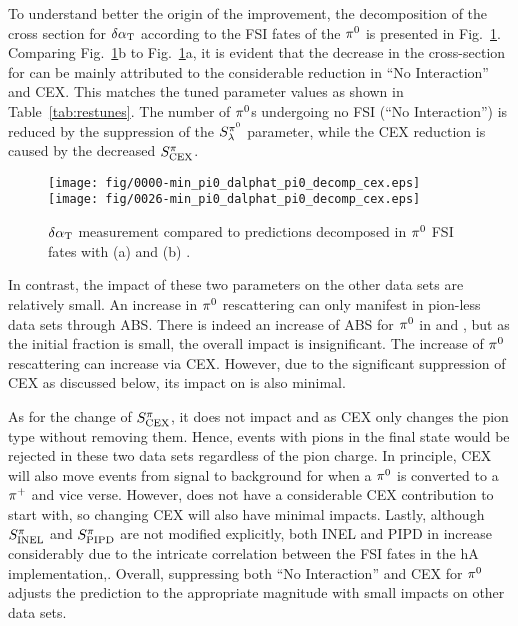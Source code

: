     To understand better the origin of the improvement, the decomposition of the cross section for $\delta\alpha_\textrm{T}$ according to the FSI fates of the $\pi^0$ is presented in Fig.~\ref{fig:CEX-minpiz-dat-pi0}.
    Comparing Fig.~\ref{fig:CEX-minpiz-dat-pi0}b to Fig.~\ref{fig:CEX-minpiz-dat-pi0}a, it is evident that the decrease in the cross-section for \gC can be mainly attributed to the considerable reduction in ``No Interaction'' and CEX.
    This matches the tuned parameter values as shown in Table~\ref{tab:restunes}.
    The number of $\pi^0$s undergoing no FSI (``No Interaction'') is reduced by the suppression of the $S_\lambda^{\pi^{0}}$ parameter, while the CEX reduction is caused by the decreased $S_\textrm{CEX}^{\pi}$.
    \begin{figure}[!htb] 	
        \centering 		
        \texttt{[image: fig/0000-min\_pi0\_dalphat\_pi0\_decomp\_cex.eps]}
        \texttt{[image: fig/0026-min\_pi0\_dalphat\_pi0\_decomp\_cex.eps]}	
        \caption{\label{fig:CEX-minpiz-dat-pi0} \minpiz $\delta\alpha_\textrm{T}$ measurement compared to \genie predictions decomposed in $\pi^0$ FSI fates with (a) \gZero and (b) \gC.} 
    \end{figure}
    In contrast, the impact of these two parameters on the other data sets are relatively small.
    An increase in $\pi^0$ rescattering can only manifest in pion-less data sets through ABS. 
    There is indeed an increase of ABS for $\pi^0$ in \ttkzpi and \minzpi, but as the initial fraction is small, the overall impact is insignificant. 
    The increase of $\pi^0$ rescattering can increase \ttkpip via CEX. 
    However, due to the significant suppression of CEX as discussed below, its impact on \ttkpip is also minimal. 
    
    As for the change of $S_\textrm{CEX}^{\pi}$, it does not impact \ttkzpi and \minzpi as CEX only changes the pion type without removing them.
    Hence, events with pions in the final state would be rejected in these two data sets regardless of the pion charge. 
    In principle, CEX will also move events from signal to background for \ttkpip when a $\pi^0$ is converted to a $\pi^+$ and vice verse. 
    However, \ttkpip does not have a considerable CEX contribution to start with, so changing CEX will also have minimal impacts. 
    Lastly, although $S_\textrm{INEL}^{\pi}$ and $S_\textrm{PIPD}^{\pi}$ are not modified explicitly, both INEL and PIPD in \minpiz increase  considerably due to the intricate correlation between the FSI fates in the hA implementation,. 
    Overall, suppressing both ``No Interaction'' and CEX for $\pi^0$ adjusts the \minpiz prediction to the appropriate magnitude with small impacts on other data sets.  
    
